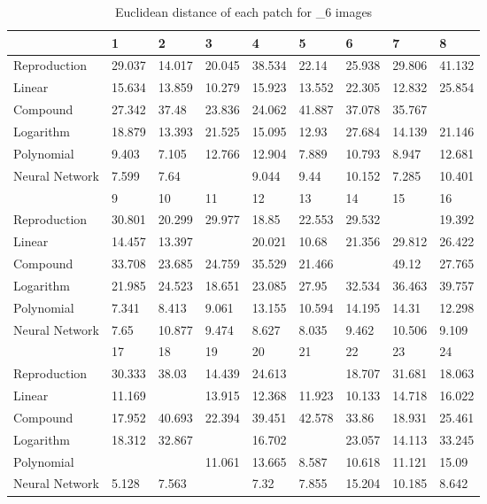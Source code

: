 \begin{table}[H]
  \begin{center}
  \resizebox{10cm}{!} {
    \begin{tabular}{|l |l |l |l |l |l |l |l |l |}\hline
          &1 &2 &3 &4 &5 &6 &7 &8\\ \hline 
        Reproduction &29.037 &14.017 &20.045 &38.534 &22.14 &25.938 &29.806 &41.132\\ 
        Linear &15.634 &13.859 &10.279 &15.923 &13.552 &22.305 &12.832 &25.854\\ 
        Compound &27.342 &37.48 &23.836 &24.062 &41.887 &37.078 &35.767 &\cellcolor{colorred}{64.759}\\ 
        Logarithm &18.879 &13.393 &21.525 &15.095 &12.93 &27.684 &14.139 &21.146\\ 
        Polynomial &9.403 &7.105 &12.766 &12.904 &7.889 &10.793 &8.947 &12.681\\ 
        Neural Network &7.599 &7.64 &\cellcolor{colorred}{16.983} &9.044 &9.44 &10.152 &7.285 &10.401\\ \hline 
          &9 &10 &11 &12 &13 &14 &15 &16\\ \hline 
        Reproduction &30.801 &20.299 &29.977 &18.85 &22.553 &29.532 &\cellcolor{colorred}{49.018} &19.392\\ 
        Linear &14.457 &13.397 &\cellcolor{colorgreen}{10.068} &20.021 &10.68 &21.356 &29.812 &26.422\\ 
        Compound &33.708 &23.685 &24.759 &35.529 &21.466 &\cellcolor{colorgreen}{11.624} &49.12 &27.765\\ 
        Logarithm &21.985 &24.523 &18.651 &23.085 &27.95 &32.534 &36.463 &39.757\\ 
        Polynomial &7.341 &8.413 &9.061 &13.155 &10.594 &14.195 &14.31 &12.298\\ 
        Neural Network &7.65 &10.877 &9.474 &8.627 &8.035 &9.462 &10.506 &9.109\\ \hline 
          &17 &18 &19 &20 &21 &22 &23 &24\\ \hline 
        Reproduction &30.333 &38.03 &14.439 &24.613 &\cellcolor{colorgreen}{13.422} &18.707 &31.681 &18.063\\ 
        Linear &11.169 &\cellcolor{colorred}{43.268} &13.915 &12.368 &11.923 &10.133 &14.718 &16.022\\ 
        Compound &17.952 &40.693 &22.394 &39.451 &42.578 &33.86 &18.931 &25.461\\ 
        Logarithm &18.312 &32.867 &\cellcolor{colorred}{57.908} &16.702 &\cellcolor{colorgreen}{8.22} &23.057 &14.113 &33.245\\ 
        Polynomial &\cellcolor{colorgreen}{6.459} &\cellcolor{colorred}{15.474} &11.061 &13.665 &8.587 &10.618 &11.121 &15.09\\ 
        Neural Network &5.128 &7.563 &\cellcolor{colorgreen}{4.473} &7.32 &7.855 &15.204 &10.185 &8.642\\ \hline 
    \end{tabular}
  }
  \caption{Euclidean distance of each patch for _6 images }
  \end{center}
\end{table}
